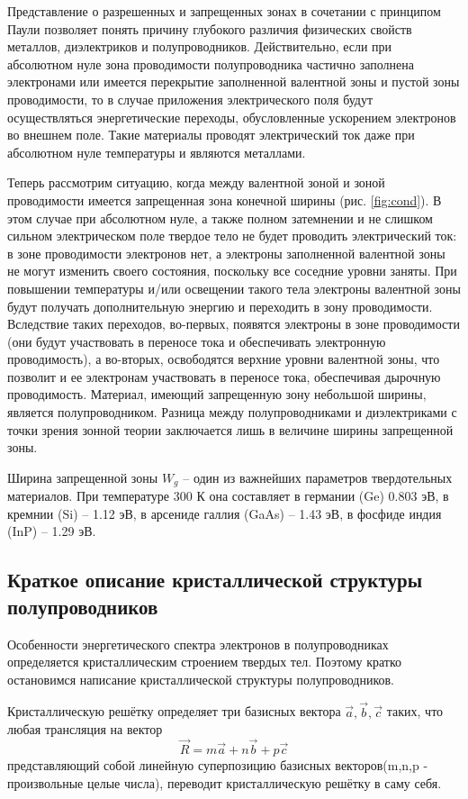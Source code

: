 	Представление о разрешенных и запрещенных зонах в сочетании с принципом Паули позволяет понять причину глубокого
	различия физических свойств металлов, диэлектриков и полупроводников. Действительно, если при абсолютном нуле зона
	проводимости полупроводника частично заполнена электронами или имеется перекрытие заполненной валентной зоны и пустой
	зоны проводимости, то в случае приложения электрического поля будут осуществляться энергетические переходы,
	обусловленные ускорением электронов во внешнем поле. Такие материалы проводят электрический ток даже при абсолютном нуле
	температуры и являются металлами.  
	
	Теперь рассмотрим ситуацию, когда между валентной зоной и зоной проводимости имеется запрещенная зона конечной ширины
	(рис. \ref{fig:cond}). В этом случае при абсолютном нуле, а также полном затемнении и не слишком сильном электрическом поле твердое
	тело не будет проводить электрический ток: в зоне проводимости электронов нет, а электроны заполненной валентной зоны не
	могут изменить своего состояния, поскольку все соседние уровни заняты. При повышении температуры и/или освещении такого
	тела электроны валентной зоны будут получать дополнительную энергию и переходить в зону проводимости. Вследствие таких
	переходов, во-первых, появятся электроны в зоне проводимости (они будут участвовать в переносе тока и обеспечивать
	электронную проводимость), а во-вторых, освободятся верхние уровни валентной зоны, что позволит и ее электронам
	участвовать в переносе тока, обеспечивая дырочную проводимость. Материал, имеющий запрещенную зону небольшой ширины,
	является полупроводником. Разница между полупроводниками и диэлектриками с точки зрения зонной теории заключается лишь в
	величине ширины запрещенной зоны.
	
	Ширина запрещенной зоны $W_g$  – один из важнейших параметров твердотельных материалов.
	При температуре 300 К она составляет в германии (Ge) 0.803 эВ, в кремнии (Si) – 1.12 эВ, в арсениде галлия (GaAs) – 1.43
	эВ, в фосфиде индия (InP) – 1.29 эВ.
	
	\subsection{Краткое описание кристаллической структуры полупроводников}
	Особенности энергетического спектра электронов в полупроводниках определяется кристаллическим строением твердых тел.
	Поэтому кратко остановимся написание кристаллической структуры полупроводников.
	
	Кристаллическую решётку определяет три базисных вектора $\vec{a},\vec{b},\vec{c}$ таких, что любая трансляция на вектор
	\begin{equation}
	\vec{R} = m \vec{a} + n \vec{b} + p \vec{c}
	\label{eq:1.1}
	\end{equation}
	представляющий собой линейную суперпозицию базисных векторов(m,n,p - произвольные целые числа), переводит
	кристаллическую решётку в саму себя. 
	

